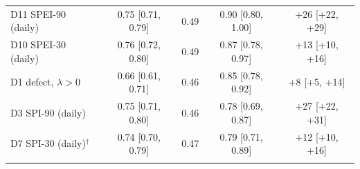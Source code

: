 \begin{table}[tbp]
\begin{tabular*}{\textwidth}{@{\extracolsep\fill}lcccc}
\quad D11 SPEI-90 (daily) & 0.75 [0.71, 0.79] & 0.49 & 0.90 [0.80, 1.00] & +26 [+22, +29] \\
\quad D10 SPEI-30 (daily) & 0.76 [0.72, 0.80] & 0.49 & 0.87 [0.78, 0.97] & +13 [+10, +16] \\
\quad D1 defect, $\lambda>0$ & 0.66 [0.61, 0.71] & 0.46 & 0.85 [0.78, 0.92] & +8 [+5, +14] \\
\quad D3 SPI-90 (daily) & 0.75 [0.71, 0.80] & 0.46 & 0.78 [0.69, 0.87] & +27 [+22, +31] \\
\quad D7 SPI-30 (daily)$^{\dagger}$ & 0.74 [0.70, 0.79] & 0.47 & 0.79 [0.71, 0.89] & +12 [+10, +16] \\
\botrule
\end{tabular*}
\end{table}
